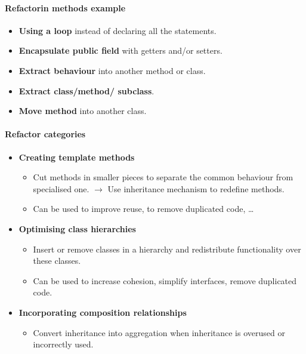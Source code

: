 \documentclass[a4paper,11pt]{report}
\begin{document}
		\paragraph{Refactorin methods example}
			\begin{itemize}
				\setlength{\itemsep}{0pt}
				\setlength{\parskip}{0pt}
				\setlength{\parsep}{0pt}
				\item \textbf{Using a loop} instead of
					declaring all the statements.
				\item \textbf{Encapsulate public field}
					with getters and/or setters.
				\item \textbf{Extract behaviour} into
					another method or class.
				\item \textbf{Extract class/method/%
					subclass}.
				\item \textbf{Move method} into another
					class.
			\end{itemize}
		\paragraph{Refactor categories}
			\begin{itemize}
				\setlength{\itemsep}{0pt}
				\setlength{\parskip}{0pt}
				\setlength{\parsep}{0pt}
				\item \textbf{Creating template methods}
					\begin{itemize}
						\setlength{\itemsep}{0pt}
						\setlength{\parskip}{0pt}
						\setlength{\parsep}{0pt}
						\item Cut methods in smaller 
							pieces to separate the
							common behaviour from
							specialised one.
							$\rightarrow$ 
							Use inheritance mechanism
							to redefine methods.
						 \item Can be used to improve
						 	reuse, to remove duplicated
						 	code, …
					\end{itemize}
				\item \textbf{Optimising class 
					hierarchies}
					\begin{itemize}
						\setlength{\itemsep}{0pt}
						\setlength{\parskip}{0pt}
						\setlength{\parsep}{0pt}
						\item Insert or remove classes 
							in a hierarchy and
							redistribute functionality 
							over these classes.
						\item Can be used to increase
							cohesion, simplify
							interfaces, remove duplicated
							code.
					\end{itemize}
				\item \textbf{Incorporating composition
					relationships}
					\begin{itemize}
						\setlength{\itemsep}{0pt}
						\setlength{\parskip}{0pt}
						\setlength{\parsep}{0pt}
						\item Convert inheritance into
						aggregation when inheritance is
						overused or incorrectly used.
					\end{itemize}
			\end{itemize}
		\newpage
\end{document}
